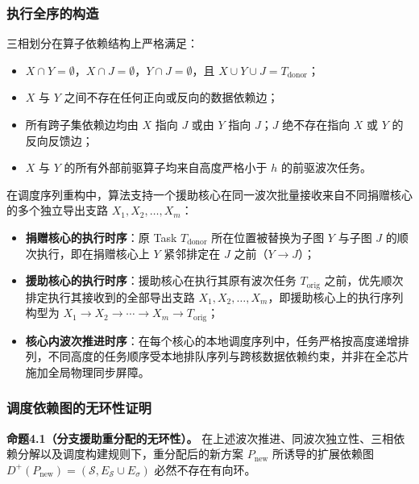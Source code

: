 \documentclass[anonymous,withtoc]{gmcm2026}
\providecommand{\tightlist}{\setlength{\itemsep}{0pt}\setlength{\parskip}{0pt}}
\begin{document}
\subsubsection{执行全序的构造}

三相划分在算子依赖结构上严格满足：

\begin{itemize}
\tightlist
\item
  \(X \cap Y = \emptyset\)，\(X \cap J = \emptyset\)，\(Y \cap J = \emptyset\)，且 \(X \cup Y \cup J = T_{\mathrm{donor}}\)；
\item
  \(X\) 与 \(Y\) 之间不存在任何正向或反向的数据依赖边；
\item
  所有跨子集依赖边均由 \(X\) 指向 \(J\) 或由 \(Y\) 指向 \(J\)；\(J\) 绝不存在指向 \(X\) 或 \(Y\) 的反向反馈边；
\item
  \(X\) 与 \(Y\) 的所有外部前驱算子均来自高度严格小于 \(h\) 的前驱波次任务。
\end{itemize}

在调度序列重构中，算法支持一个援助核心在同一波次批量接收来自不同捐赠核心的多个独立导出支路 \(X_1, X_2, \dots, X_m\)：

\begin{itemize}
\tightlist
\item
  \textbf{捐赠核心的执行时序}：原 Task \(T_{\mathrm{donor}}\) 所在位置被替换为子图 \(Y\) 与子图 \(J\) 的顺次执行，即在捐赠核心上 \(Y\) 紧邻排定在 \(J\) 之前（\(Y \to J\)）；
\item
  \textbf{援助核心的执行时序}：援助核心在执行其原有波次任务 \(T_{\mathrm{orig}}\) 之前，优先顺次排定执行其接收到的全部导出支路 \(X_1, X_2, \dots, X_m\)，即援助核心上的执行序列构型为 \(X_1 \to X_2 \to \cdots \to X_m \to T_{\mathrm{orig}}\)；
\item
  \textbf{核心内波次推进时序}：在每个核心的本地调度序列中，任务严格按高度递增排列，不同高度的任务顺序受本地排队序列与跨核数据依赖约束，并非在全芯片施加全局物理同步屏障。
\end{itemize}

\subsubsection{调度依赖图的无环性证明}

\textbf{命题4.1（分支援助重分配的无环性）。} 在上述波次推进、同波次独立性、三相依赖分解以及调度构建规则下，重分配后的新方案 \(P_{\mathrm{new}}\) 所诱导的扩展依赖图 \(D^+(P_{\mathrm{new}}) = (\mathcal{S}, E_{\mathcal{S}} \cup E_\sigma)\) 必然不存在有向环。
\end{document}
